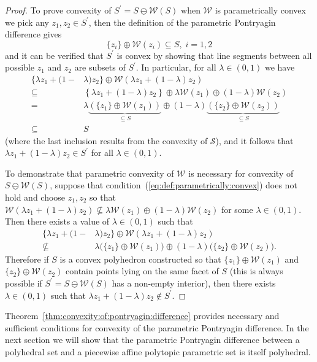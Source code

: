 \documentclass[journal]{IEEEtran}
\theoremstyle{remark}
\theoremstyle{definition}
\begin{document}
\begin{proof}
To prove convexity of $S^\prime =  S\ominus \mathcal W( S)$ when $\mathcal W$ is parametrically convex we pick any $z_1,z_2\in S^\prime$, then
the definition of the parametric Pontryagin difference gives
\begin{equation}
  \{z_i\} \oplus \mathcal W(z_i) \subseteq S,\; i=1,2 
\end{equation}
%
and it can be verified that $S^\prime$ is convex by showing that line segments between all possible $z_1$ and $z_2$ are subsets of $S^\prime$. In particular, for all $\lambda \in (0,1)$ we have
\begin{align*}
  \{ \lambda z_1 + (1-&\lambda)z_2
  \}\oplus \mathcal W\left( \lambda z_1 + (1-\lambda)z_2\right)\\
  \subseteq&\left\{ \lambda z_1 + (1-\lambda)z_2
  \right\}\oplus \lambda \mathcal W(z_1) \oplus (1-\lambda)
  \mathcal W(z_2)\\
 = &\lambda\underbrace{(\{z_1\}\oplus \mathcal W(z_1))}_{\subseteq S}\oplus
  (1-\lambda)\underbrace{(\{z_2\}\oplus \mathcal W(z_2))}_{\subseteq S}\\
  \subseteq& S
\end{align*}
%
(where the last inclusion results from the convexity of $\mathcal S$), and it follows that
$\lambda z_1 + (1-\lambda) z_2 \in S^\prime$ for all $\lambda \in (0,1)$. 
%

To demonstrate that parametric convexity of $\mathcal W$ is necessary for convexity of $S\ominus \mathcal W(S)$, suppose that condition~(\ref{eq:def:parametrically:convex}) does not hold and choose $z_1,z_2$ so that $\mathcal W(\lambda z_1 + (1-\lambda) z_2) \not\subseteq \lambda \mathcal W(z_1) \oplus (1-\lambda) \mathcal W (z_2)$ for some $\lambda \in (0,1)$. Then there exists a value of $\lambda\in(0,1)$ such that
\begin{align*}
  \{ \lambda z_1 + (1-&\lambda)z_2
  \}\oplus \mathcal W\left( \lambda z_1 + (1-\lambda)z_2\right)\\
 \not\subseteq &\lambda\bigl(\{z_1\}\oplus \mathcal W(z_1)\bigr)\oplus
  (1-\lambda)\bigl(\{z_2\}\oplus \mathcal W(z_2)\bigr) .
\end{align*}
Therefore if $S$ is a convex polyhedron constructed so that $\{z_1\}\oplus\mathcal W(z_1)$ and $\{z_2\}\oplus\mathcal W(z_2)$ contain points lying on the same facet of $S$ (this is always possible if $S^\prime=S\ominus \mathcal W(S)$ has a non-empty interior), then there exists $\lambda \in (0,1)$ such that $\lambda z_1 + (1-\lambda) z_2 \notin S^\prime$.
%
\end{proof}
%
Theorem~\ref{thm:convexity:of:pontryagin:difference} provides necessary and sufficient conditions for convexity of the parametric Pontryagin difference. In the next section we will show that the parametric Pontryagin difference between a polyhedral set and a piecewise affine polytopic parametric set is itself polyhedral.
%
%
%
%
%
%
\end{document}
